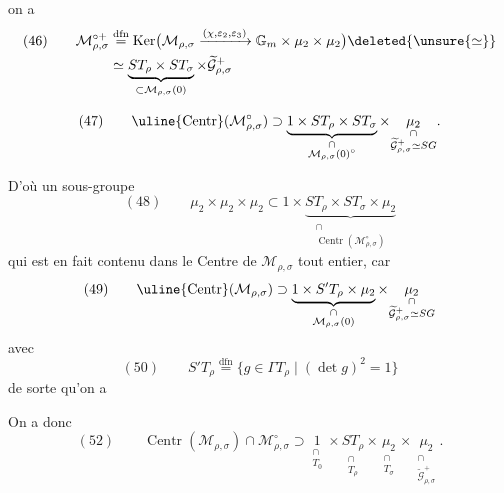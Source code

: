 \par{}


on a
\[
\begin{aligned}
(46)\qquad
\mathcal M_{\rho,\sigma}^{\circ+}
&\overset{\mathrm{dfn}}{=}
\operatorname{Ker}\bigl(\mathcal M_{\rho,\sigma}
\xrightarrow{(\chi,\varepsilon_2,\varepsilon_3)}
\mathbb G_m\times\mu_2\times\mu_2\bigr)
\deleted{\unsure{\simeq}}\\
&\simeq
\underbrace{ST_\rho\times ST_\sigma}_{\subset\mathcal M_{\rho,\sigma}(0)}
\times\widetilde{\mathcal G}_{\rho,\sigma}^{+}
\end{aligned}
\]



\[
(47)\qquad
\uline{\operatorname{Centr}}(\mathcal M_{\rho,\sigma}^{\circ})
\supset
\underbrace{1\times ST_\rho\times ST_\sigma}_{\substack{\cap\\
\mathcal M_{\rho,\sigma}(0)^\circ}}
\times
\underset{\substack{\cap\\\widetilde{\mathcal G}_{\rho,\sigma}^{+}\simeq SG}}{\mu_2}.
\]

D'où un sous-groupe
\[
(48)\qquad
\mu_2\times\mu_2\times\mu_2
\subset 1\times
\underbrace{ST_\rho\times ST_\sigma\times\mu_2}_{\substack{\cap\\
\operatorname{Centr}(\mathcal M_{\rho,\sigma}^{\circ})}}
\]
qui est en fait contenu dans le Centre de $\mathcal M_{\rho,\sigma}$
tout entier, car
\[
(49)\qquad
\uline{\operatorname{Centr}}(\mathcal M_{\rho,\sigma})
\supset
\underbrace{1\times S'T_\rho\times\mu_2}_{\substack{\cap\\
\mathcal M_{\rho,\sigma}(0)}}
\times
\underset{\substack{\cap\\\widetilde{\mathcal G}_{\rho,\sigma}^{+}\simeq SG}}{\mu_2}
\]
avec
\[
(50)\qquad
S'T_\rho\overset{\mathrm{dfn}}{=}
\{g\in\Gamma T_\rho\mid(\det g)^2=1\}
\]
de sorte qu'on a

On a donc
\[
(52)\qquad
\operatorname{Centr}(\mathcal M_{\rho,\sigma})\cap
\mathcal M_{\rho,\sigma}^{\circ}
\supset
\underset{\substack{\cap\\T_0}}{1}\times
\underset{\substack{\cap\\T_\rho}}{ST_\rho}\times
\underset{\substack{\cap\\T_\sigma}}{\mu_2}\times
\underset{\substack{\cap\\\widetilde{\mathcal G}_{\rho,\sigma}^{+}}}{\mu_2}.
\]

